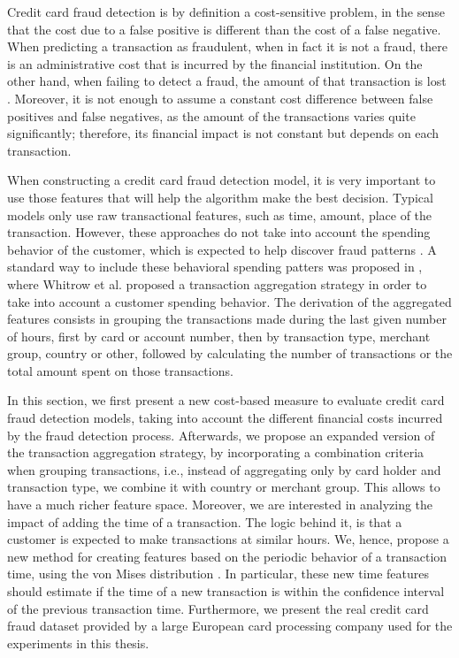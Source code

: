   Credit card fraud detection is by definition a cost-sensitive problem, in the sense that the 
  cost  due to a false positive is different than the cost of a false negative. When predicting a   
  transaction   as fraudulent, when in fact it is not a fraud, there is an administrative cost that 
  is incurred by  the financial institution. On the other hand, when failing to detect a fraud, the 
  amount of that  transaction is lost \citep{Hand2007a}. Moreover, it is not enough  to assume a  
  constant cost   difference between false positives and false negatives, as the amount of the  
  transactions varies   quite significantly; therefore, its financial impact is not constant but  
  depends on each   transaction. 
  
  When constructing a credit card fraud detection model, it is very important to use those features 
  that will help the algorithm make the best decision. Typical models only use raw transactional 
  features, such as time, amount, place of the transaction. However, these approaches do not take 
  into account the spending behavior of the customer, which is expected to help discover fraud 
  patterns \citep{Gadi2008}. A standard way to include these behavioral spending patters was 
  proposed in \citep{Whitrow2008}, where Whitrow et al. proposed a transaction aggregation strategy 
  in order to take   into account a customer spending behavior. The derivation of the aggregated 
  features consists in grouping the transactions made during the last given number of hours, first 
  by card or account number, then by transaction type, merchant group, country or other, followed 
  by calculating  the number of transactions or the total amount spent on those transactions.
	
	In this section,  we first present a new cost-based measure to evaluate   credit card fraud 
  detection models, taking into account the different financial costs incurred by   the fraud 
  detection process. Afterwards, we propose an expanded version of the transaction 
  aggregation strategy, by  incorporating a combination criteria when grouping transactions, i.e., 
  instead of aggregating only  by card holder and transaction type, we combine it with 
  country or merchant group. This allows to have a much richer feature space. Moreover, we are 
  interested in analyzing the impact of adding the time of a transaction. The logic behind it, is 
  that a customer is expected to make transactions at similar hours. We, hence, propose a new 
  method for creating features  based on the  periodic behavior of a transaction time, using the 
  von Mises distribution \citep{Fisher1996}. In particular, these new time features should estimate 
  if the time of a new transaction is within the confidence interval of the  previous transaction 
  time. Furthermore, we present the real credit card fraud dataset 
  provided  by a large European card processing company used for the experiments in this 
  thesis.
  

